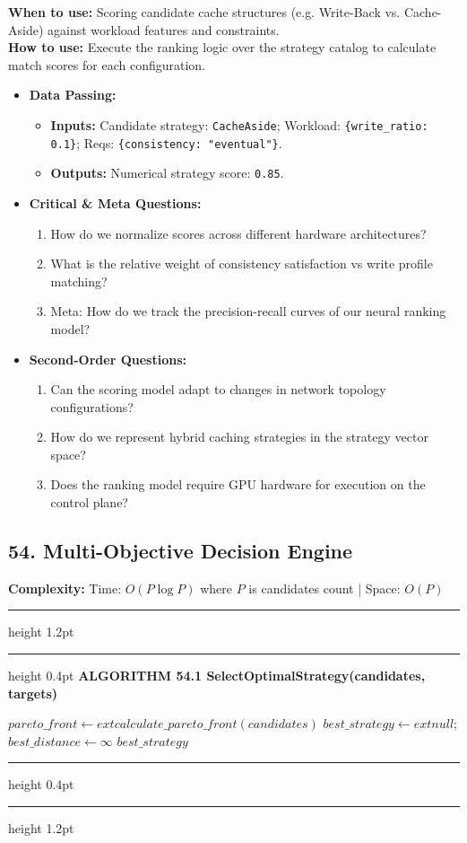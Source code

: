 \documentclass[11pt,a4paper]{article}
\newenvironment{textbookalgo}[2]{%
  \par\addvspace{1.2em}\noindent
  \hrule height 1.2pt
  \vspace{1.5pt}
  \hrule height 0.4pt
  \vspace{5pt}
  {\noindent\large\bfseries\sffamily ALGORITHM #1 \quad #2}
  \par\vspace{5pt}
  \RestyleAlgo{plain}
}{%
  \par\vspace{4pt}
  \hrule height 0.4pt
  \vspace{1.5pt}
  \hrule height 1.2pt
  \par\addvspace{1.2em}
}
\theoremstyle{definition}
\begin{document}
\noindent
\textbf{When to use:} Scoring candidate cache structures (e.g. Write-Back vs. Cache-Aside) against workload features and constraints.\\
\textbf{How to use:} Execute the ranking logic over the strategy catalog to calculate match scores for each configuration.
\begin{itemize}[leftmargin=*]
  \item[] \textbf{Data Passing:}
    \begin{itemize}
      \item \textbf{Inputs:} Candidate strategy: \texttt{CacheAside}; Workload: \texttt{\{write\_ratio: 0.1\}}; Reqs: \texttt{\{consistency: "eventual"\}}.
      \item \textbf{Outputs:} Numerical strategy score: \texttt{0.85}.
    \end{itemize}
  \item[] \textbf{Critical \& Meta Questions:}
  \begin{enumerate}
    \item How do we normalize scores across different hardware architectures?
    \item What is the relative weight of consistency satisfaction vs write profile matching?
    \item Meta: How do we track the precision-recall curves of our neural ranking model?
  \end{enumerate}
  \item[] \textbf{Second-Order Questions:}
  \begin{enumerate}
    \item Can the scoring model adapt to changes in network topology configurations?
    \item How do we represent hybrid caching strategies in the strategy vector space?
    \item Does the ranking model require GPU hardware for execution on the control plane?
  \end{enumerate}
\end{itemize}
\medskip

\clearpage
\subsection{54. Multi-Objective Decision Engine}


\noindent
\textbf{Complexity:} Time: $O(P \log P)$ where $P$ is candidates count | Space: $O(P)$
\smallskip

\begin{textbookalgo}{54.1}{SelectOptimalStrategy(candidates, targets)}
\begin{algorithm}[H]
$pareto\_front \leftarrow 	ext{calculate\_pareto\_front}(candidates)$\;
$best\_strategy \leftarrow 	ext{null}$; $best\_distance \leftarrow \infty$\;
\Return $best\_strategy$\;
\end{algorithm}
\end{textbookalgo}
\end{document}
